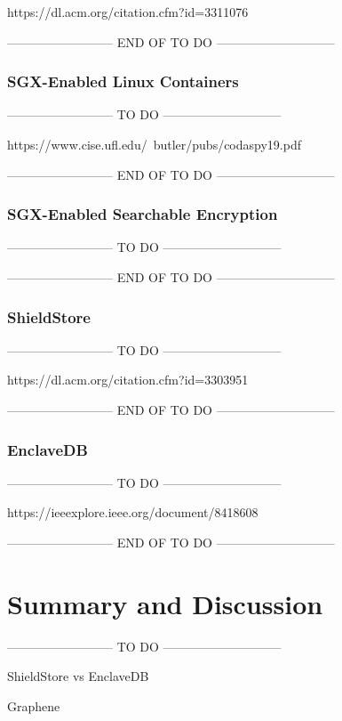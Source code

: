 https://dl.acm.org/citation.cfm?id=3311076

-------------------------- END OF TO DO -----------------------------

\subsubsection{SGX-Enabled Linux Containers}
-------------------------- TO DO -----------------------------

https://www.cise.ufl.edu/~butler/pubs/codaspy19.pdf

-------------------------- END OF TO DO -----------------------------

\subsubsection{SGX-Enabled Searchable Encryption}
-------------------------- TO DO -----------------------------

-------------------------- END OF TO DO -----------------------------


\subsubsection{ShieldStore}
-------------------------- TO DO -----------------------------

https://dl.acm.org/citation.cfm?id=3303951

-------------------------- END OF TO DO -----------------------------

\subsubsection{EnclaveDB}
-------------------------- TO DO -----------------------------

https://ieeexplore.ieee.org/document/8418608

-------------------------- END OF TO DO -----------------------------






\section{Summary and Discussion}
-------------------------- TO DO -----------------------------

ShieldStore vs EnclaveDB

Graphene

